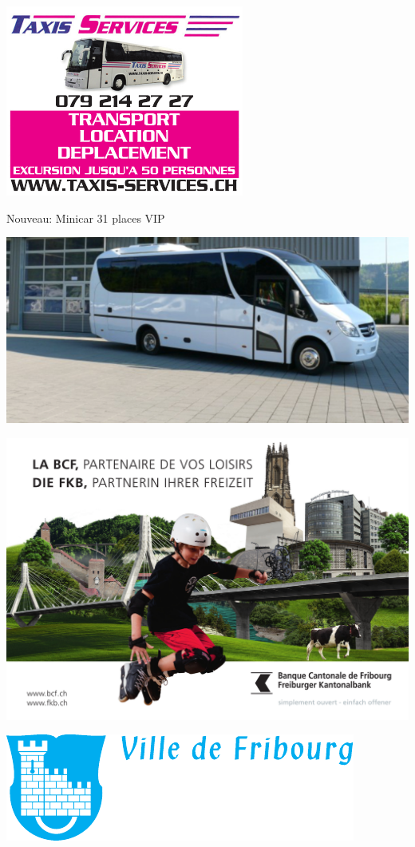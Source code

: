 {\centering
\includegraphics[width=.95\textwidth]{fig/taxi.pdf}
\par
\vspace*{20mm}

{\Huge
Nouveau: Minicar 31 places VIP}
\par
\includegraphics[width=.8\textwidth]{fig/bus.png}
\par
}

\clearpage
\thispagestyle{empty}%
{\centering
\includegraphics[width=\textwidth]{fig/bcf.jpg}
\par
\vspace*{20mm}
\vfill
\includegraphics[width=.8\textwidth]{fig/ville.pdf}
\vfill
\par
}
